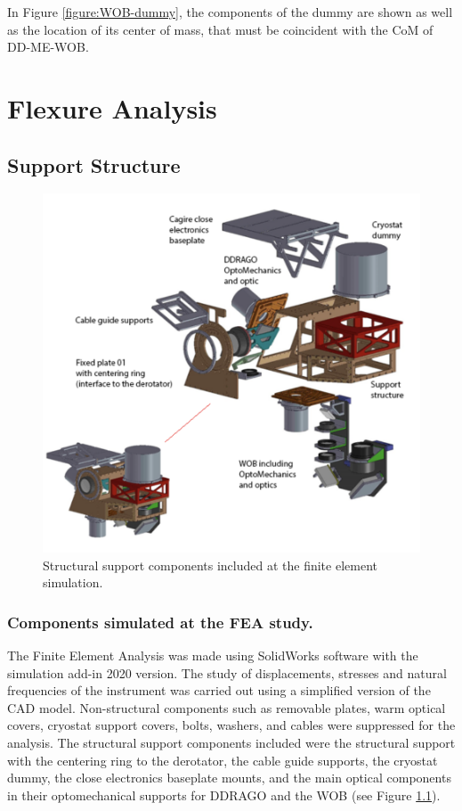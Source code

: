 \documentclass{report}
\begin{document}
In Figure \ref{figure:WOB-dummy}, the components of the dummy are shown as well as the location of its center of mass, that must be coincident with the CoM of DD-ME-WOB. 


\clearpage

\chapter{Flexure Analysis} 

\section{Support Structure}

\begin{figure}
\centering
\includegraphics[width=0.8\linewidth]{figures/FEAss1.png}
\caption{Structural support components included at the finite element simulation.}
\label{figure:FEAss1}
\end{figure}

\subsection{Components simulated at the FEA study.}

The Finite Element Analysis was made using SolidWorks software with the simulation add-in 2020 version. The study of displacements, stresses and natural frequencies of the instrument was carried out using a simplified version of the CAD model. Non-structural components such as removable plates, warm optical covers, cryostat support covers, bolts, washers, and cables were suppressed for the analysis. The structural support components included were the structural support with the centering ring to the derotator, the cable guide supports, the cryostat dummy, the close electronics baseplate mounts, and the main optical components in their optomechanical supports for DDRAGO and the WOB (see Figure \ref{figure:FEAss1}).
\end{document}
